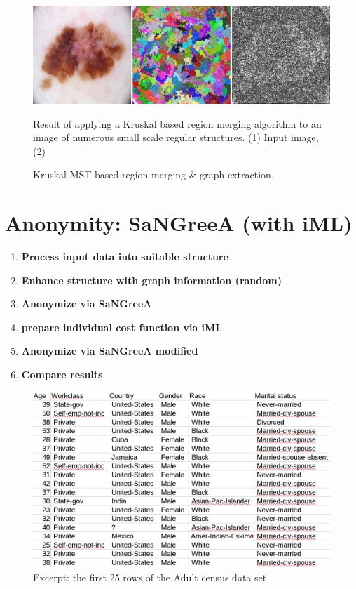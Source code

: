 	\begin{figure}[H]
		\begin{center}
			\includegraphics [width=1\textwidth] {figures/graph_ext}
			\caption{Kruskal MST based region merging \& graph extraction.}
			\label{fig:graph_extract}
		\end{center}
		\small 
		Result of applying a Kruskal based region merging algorithm to an image of numerous small scale regular structures. (1) Input image, (2) 
		
	\end{figure}


\section{Anonymity: SaNGreeA (with iML)}
\label{sect:aoa_anonymization}

	\begin{enumerate}
		\item \textbf{Process input data into suitable structure}
		\item \textbf{Enhance structure with graph information (random)}
		\item \textbf{Anonymize via SaNGreeA}
		\item \textbf{prepare individual cost function via iML}
		\item \textbf{Anonymize via SaNGreeA modified}
		\item \textbf{Compare results}
	\end{enumerate}
	
	\begin{figure}[ht]
		\begin{center}
			\includegraphics[width=1\textwidth]{figures/anonym/anon_adults_input_sample_pic}
			\caption{Excerpt: the first 25 rows of the Adult census data set}
			\label{fig:anonIML}
		\end{center}
	\end{figure}



